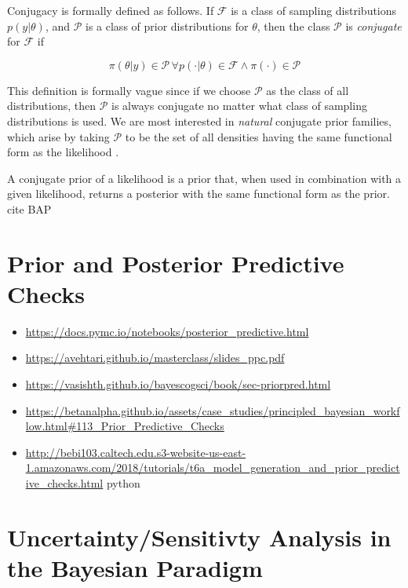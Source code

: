 Conjugacy is formally defined as follows. If $\mathcal{F}$ is a class of sampling distributions $p \left(y | \theta \right)$, and $\mathcal{P}$ is a class of prior distributions for $\theta$, then the class $\mathcal{P}$ is \textit{conjugate} for $\mathcal{F}$ if

\begin{equation}
    \pi \left(\theta | y \right) \in \mathcal{P} \, \forall p \left(\cdot | \theta \right) \in \mathcal{F} \land \pi (\cdot) \in \mathcal{P}
\end{equation}

This definition is formally vague since if we choose $\mathcal{P}$ as the class of all distributions, then $\mathcal{P}$ is always conjugate no matter what class of sampling distributions is used. We are most interested in \textit{natural} conjugate prior families, which arise by taking $\mathcal{P}$ to be the set of all densities having the same functional form as the likelihood \cite{ABC_ch1}.

A conjugate prior of a likelihood is a prior that, when used in combination with a given likelihood, returns a posterior with the same functional form as the prior. cite BAP

\section{Prior and Posterior Predictive Checks}

\begin{itemize}
    \item \url{https://docs.pymc.io/notebooks/posterior_predictive.html}
    \item \url{https://avehtari.github.io/masterclass/slides_ppc.pdf}
    \item \url{https://vasishth.github.io/bayescogsci/book/sec-priorpred.html}
    \item \url{https://betanalpha.github.io/assets/case_studies/principled_bayesian_workflow.html#113_Prior_Predictive_Checks}
    \item \url{http://bebi103.caltech.edu.s3-website-us-east-1.amazonaws.com/2018/tutorials/t6a_model_generation_and_prior_predictive_checks.html} python
\end{itemize}

\section{Uncertainty/Sensitivty Analysis in the Bayesian Paradigm}

